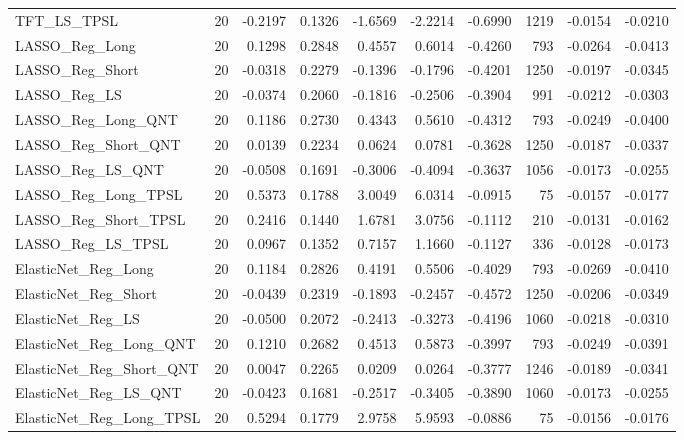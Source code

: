 \begin{tabular}{llrrrrrrrr}
\cline{1-10}
TFT\_LS\_TPSL & 20 & -0.2197 & 0.1326 & -1.6569 & -2.2214 & -0.6990 & 1219 & -0.0154 & -0.0210 \\
\cline{1-10}
LASSO\_Reg\_Long & 20 & 0.1298 & 0.2848 & 0.4557 & 0.6014 & -0.4260 & 793 & -0.0264 & -0.0413 \\
\cline{1-10}
LASSO\_Reg\_Short & 20 & -0.0318 & 0.2279 & -0.1396 & -0.1796 & -0.4201 & 1250 & -0.0197 & -0.0345 \\
\cline{1-10}
LASSO\_Reg\_LS & 20 & -0.0374 & 0.2060 & -0.1816 & -0.2506 & -0.3904 & 991 & -0.0212 & -0.0303 \\
\cline{1-10}
LASSO\_Reg\_Long\_QNT & 20 & 0.1186 & 0.2730 & 0.4343 & 0.5610 & -0.4312 & 793 & -0.0249 & -0.0400 \\
\cline{1-10}
LASSO\_Reg\_Short\_QNT & 20 & 0.0139 & 0.2234 & 0.0624 & 0.0781 & -0.3628 & 1250 & -0.0187 & -0.0337 \\
\cline{1-10}
LASSO\_Reg\_LS\_QNT & 20 & -0.0508 & 0.1691 & -0.3006 & -0.4094 & -0.3637 & 1056 & -0.0173 & -0.0255 \\
\cline{1-10}
LASSO\_Reg\_Long\_TPSL & 20 & 0.5373 & 0.1788 & 3.0049 & 6.0314 & -0.0915 & 75 & -0.0157 & -0.0177 \\
\cline{1-10}
LASSO\_Reg\_Short\_TPSL & 20 & 0.2416 & 0.1440 & 1.6781 & 3.0756 & -0.1112 & 210 & -0.0131 & -0.0162 \\
\cline{1-10}
LASSO\_Reg\_LS\_TPSL & 20 & 0.0967 & 0.1352 & 0.7157 & 1.1660 & -0.1127 & 336 & -0.0128 & -0.0173 \\
\cline{1-10}
ElasticNet\_Reg\_Long & 20 & 0.1184 & 0.2826 & 0.4191 & 0.5506 & -0.4029 & 793 & -0.0269 & -0.0410 \\
\cline{1-10}
ElasticNet\_Reg\_Short & 20 & -0.0439 & 0.2319 & -0.1893 & -0.2457 & -0.4572 & 1250 & -0.0206 & -0.0349 \\
\cline{1-10}
ElasticNet\_Reg\_LS & 20 & -0.0500 & 0.2072 & -0.2413 & -0.3273 & -0.4196 & 1060 & -0.0218 & -0.0310 \\
\cline{1-10}
ElasticNet\_Reg\_Long\_QNT & 20 & 0.1210 & 0.2682 & 0.4513 & 0.5873 & -0.3997 & 793 & -0.0249 & -0.0391 \\
\cline{1-10}
ElasticNet\_Reg\_Short\_QNT & 20 & 0.0047 & 0.2265 & 0.0209 & 0.0264 & -0.3777 & 1246 & -0.0189 & -0.0341 \\
\cline{1-10}
ElasticNet\_Reg\_LS\_QNT & 20 & -0.0423 & 0.1681 & -0.2517 & -0.3405 & -0.3890 & 1060 & -0.0173 & -0.0255 \\
\cline{1-10}
ElasticNet\_Reg\_Long\_TPSL & 20 & 0.5294 & 0.1779 & 2.9758 & 5.9593 & -0.0886 & 75 & -0.0156 & -0.0176 \\

\end{tabular}
